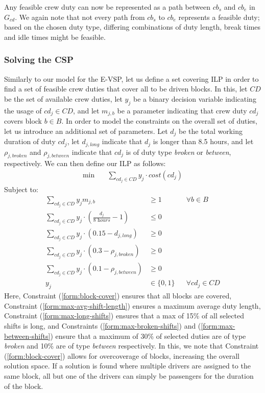 \documentclass[]{article}
\begin{document}
Any feasible crew duty can now be represented as a path between $cb_s$ and $cb_e$ in $G_{cd}$. We again note that not every path from $cb_s$ to $cb_e$ represents a feasible duty; based on the chosen duty type, differing combinations of duty length, break times and idle times might be feasible.   
\subsubsection{Solving the CSP}
Similarly to our model for the E-VSP, let us define a set covering ILP in order to find a set of feasible crew duties that cover all to be driven blocks. In this, let $\textit{CD}$ be the set of available crew duties, let $y_j$ be a binary decision variable indicating the usage of $cd_j \in \textit{CD}$, and let $m_{j,b}$ be a parameter indicating that crew duty $cd_j$ covers block $b \in B$. In order to model the constraints on the overall set of duties, let us introduce an additional set of parameters. Let $d_j$ be the total working duration of duty $cd_j$, let $d_{j,\textit{long}}$ indicate that $d_j$ is longer than 8.5 hours, and let $\rho_{j,\textit{broken}}$ and $\rho_{j,\textit{between}}$ indicate that $cd_j$ is of duty type \textit{broken} or \textit{between}, respectively. We can then define our ILP as follows:
\begin{align}
\min \quad
& \sum_{cd_j \in \textit{CD}} y_{j} \cdot cost(cd_j)
\end{align}
Subject to:
\begin{align}
\sum_{cd_j \in \textit{CD}} y_{j}m_{j,b} &\geq 1 && \forall b \in B \label{form:block-cover}\\
\sum_{cd_j \in \textit{CD}} y_{j} \cdot (\frac{d_{j}}{\textit{8 hours}} - 1) &\leq 0 && \label{form:max-avg-shift-length}\\
\sum_{cd_j \in \textit{CD}} y_{j} \cdot (0.15 - d_{j,\textit{long}}) &\geq 0 && \label{form:max-long-shifts}\\
\sum_{cd_j \in \textit{CD}} y_{j} \cdot (0.3 - \rho_{j,\textit{broken}}) &\geq 0 && \label{form:max-broken-shifts}\\
\sum_{cd_j \in \textit{CD}} y_{j} \cdot (0.1 - \rho_{j,\textit{between}}) &\geq 0 && \label{form:max-between-shifts}\\
y_{j} &\in \{ 0, 1 \} && \forall cd_j \in \textit{CD} \label{form:y-integer}
\end{align}
Here, Constraint (\ref{form:block-cover}) ensures that all blocks are covered, Constraint (\ref{form:max-avg-shift-length}) ensures a maximum average duty length, Constraint (\ref{form:max-long-shifts}) ensures that a max of 15\% of all selected shifts is long, and Constraints (\ref{form:max-broken-shifts}) and (\ref{form:max-between-shifts}) ensure that a maximum of 30\% of selected duties are of type \textit{broken} and 10\% are of type \textit{between} respectively. In this, we note that Constraint (\ref{form:block-cover}) allows for overcoverage of blocks, increasing the overall solution space. If a solution is found where multiple drivers are assigned to the same block, all but one of the drivers can simply be passengers for the duration of the block. 
\end{document}
